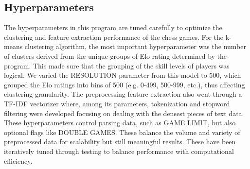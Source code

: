 \documentclass[conference]{IEEEtran}
\begin{document}
\subsection{Hyperparameters}
The hyperparameters in this program are tuned carefully to optimize the clustering and feature extraction performance of the chess games. For the k-means clustering algorithm, the most important hyperparameter was the number of clusters derived from the unique groups of Elo rating determined by the program. This made sure that the grouping of the skill levels of players was logical. We varied the RESOLUTION parameter from this model to 500, which grouped the Elo ratings into bins of 500 (e.g. 0-499, 500-999, etc.), thus affecting clustering granularity. The preprocessing feature extraction also went through a TF-IDF vectorizer where, among its parameters, tokenization and stopword filtering were developed focusing on dealing with the densest pieces of text data. These hyperparameters control parsing data, such as GAME LIMIT, but also optional flags like DOUBLE GAMES. These balance the volume and variety of preprocessed data for scalability but still meaningful results. These have been iteratively tuned through testing to balance performance with computational efficiency.
\end{document}
